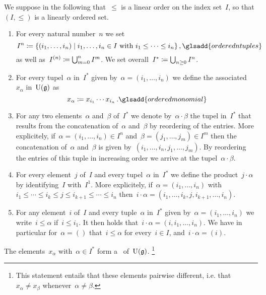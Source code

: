 \begin{convention}
	We suppose in the following that~$\leq$ is a linear order on the index set~$I$, so that~$(I, \leq)$ is a linearly ordered set.
	\begin{enumerate}
		\item
			For every natural number~$n$ we set
			\[
				I^n
				\defined
				\{
					(i_1, \dotsc, i_n)
				\suchthat
					\text{$i_1, \dotsc, i_n \in I$ with~$i_1 \leq \dotsb \leq i_n$}
				\} \,,
				\glsadd{ordered n tuples}
			\]
			as well as~$I^{(n)} \coloneqq \bigcup_{m=0}^n I^m$.
			We set overall~$I^* \coloneqq \bigcup_{n \geq 0} I^n$.
		\item
			For every tupel~$\alpha$ in~$I^*$ given by~$\alpha = (i_1, \dotsc, i_n)$ we define the associated ~$x_\alpha$ in~$\operatorname{U}(\mathfrak{g})$ as
			\[
				x_\alpha
				\defined
				x_{i_1} \dotsm x_{i_n}  \,.
				\glsadd{ordered monomial}
			\]
		\item
			For any two elements~$\alpha$ and~$\beta$ of~$I^*$ we denote by~$\alpha \cdot \beta$ the tupel in~$I^*$ that results from the concatenation of~$\alpha$ and~$\beta$ by reordering of the entries.
			More explicitely, if~$\alpha = (i_1, \dotsc, i_n) \in I^n$ and~$\beta = (j_1, \dotsc, j_m) \in I^m$ then the concatenation of~$\alpha$ and~$\beta$ is given by~$(i_1, \dotsc, i_n, j_1, \dotsc, j_m)$.
			By reordering the entries of this tuple in increasing order we arrive at the tupel~$\alpha \cdot \beta$.
		\item
			For every element~$j$ of~$I$ and every tupel~$\alpha$ in~$I^*$ we define the product~$j \cdot \alpha$ by identifying~$I$ with~$I^1$.
			More explicitely, if~$\alpha = (i_1, \dotsc, i_n)$ with~$i_1 \leq \dotsb \leq i_k \leq j \leq i_{k+1} \leq \dotsb \leq i_n$ then~$i \cdot \alpha = (i_1, \dotsc, i_k, j, i_{k+1}, \dotsc, i_n)$.
		\item
			For any element~$i$ of~$I$ and every tuple~$\alpha$ in~$I^*$ given by~$\alpha = (i_1, \dotsc, i_n)$ we write~$i \leq \alpha$ if~$i \leq i_1$.
			It then holds that~$i \cdot \alpha = (i, i_1, \dotsc, i_n)$.
			We have in particular for~$\alpha = ()$ that~$i \leq \alpha$ for every~$i \in I$, and~$i \cdot \alpha = (i)$.
	\end{enumerate}
\end{convention}


\begin{theorem}
	\label{pbw concrete}
	The elements~$x_\alpha$ with~$\alpha \in I^*$ form a~{\basis{$\kf$}} of~$\operatorname{U}(\mathfrak{g})$.%
	\footnote{This statement entails that these elements pairwise different, i.e. that~$x_\alpha \neq x_\beta$ whenever~$\alpha \neq \beta$.}
\end{theorem}


